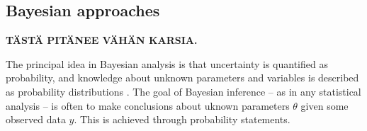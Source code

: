 















\subsection{Bayesian approaches}\label{bayesian-approaches}

\textbf{TÄSTÄ PITÄNEE VÄHÄN KARSIA.}

The principal idea in Bayesian analysis is that uncertainty is quantified as
probability, and knowledge about unknown parameters and variables is described
as probability distributions \citep{Gelman2013}. The goal of Bayesian
inference -- as in any statistical analysis -- is often to make conclusions
about uknown parameters $\theta$ given some observed data $y$. This is
achieved through probability statements.

